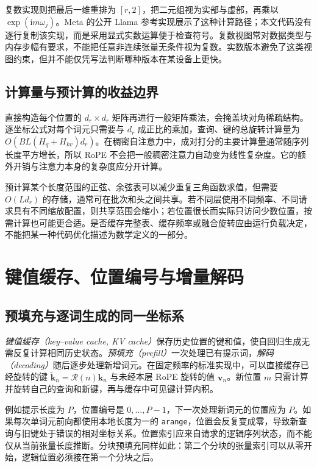 \documentclass[UTF8,12pt,a4paper,fontset=fandol]{ctexart}
\begin{document}
复数实现则把最后一维重排为 $[r,2]$，把二元组视为实部与虚部，再乘以 $\exp(\mathrm i m\omega_j)$。Meta 的公开 Llama 参考实现展示了这种计算路径\cite{meta-llama}；本文代码没有逐行复制该实现，而是采用显式实数运算便于检查符号。复数视图常对数据类型与内存步幅有要求，不能把任意非连续张量无条件视为复数。实数版本避免了这类视图约束，但并不能仅凭写法判断哪种版本在某设备上更快。

\subsection{计算量与预计算的收益边界}
直接构造每个位置的 $d_r\times d_r$ 矩阵再进行一般矩阵乘法，会掩盖块对角稀疏结构。逐坐标公式对每个词元只需要与 $d_r$ 成正比的乘加，查询、键的总旋转计算量为 $O(BL(H_q+H_{kv})d_r)$。在稠密自注意力中，成对打分的主要计算量通常随序列长度平方增长，所以 RoPE 不会把一般稠密注意力自动变为线性复杂度。它的额外开销与注意力本身的复杂度应分开计算。

预计算某个长度范围的正弦、余弦表可以减少重复三角函数求值，但需要 $O(Ld_r)$ 的存储，通常可在批次和头之间共享。若不同层使用不同频率、不同请求具有不同缩放配置，则共享范围会缩小；若位置很长而实际只访问少数位置，按需计算也可能更合适。是否缓存完整表、缓存频率或融合旋转应由运行负载决定，不能把某一种代码优化描述为数学定义的一部分。

\section{键值缓存、位置编号与增量解码}
\label{sec:rope-cache}

\subsection{预填充与逐词生成的同一坐标系}
\emph{键值缓存（key--value cache, KV cache）}保存历史位置的键和值，使自回归生成无需反复计算相同历史状态。\emph{预填充（prefill）}一次处理已有提示词，\emph{解码（decoding）}随后逐步处理新增词元。在固定频率的标准实现中，可以直接缓存已经旋转的键 $\widetilde{\mathbf k}_n=\mathcal R(n)\mathbf k_n$ 与未经本层 RoPE 旋转的值 $\mathbf v_n$。新位置 $m$ 只需计算并旋转自己的查询和新键，再与缓存中可见键计算内积。

例如提示长度为 $P$，位置编号是 $0,\ldots,P-1$，下一次处理新词元的位置应为 $P$。如果每次单词元前向都使用本地长度为一的 \texttt{arange}，位置会反复变成零，导致新查询与旧键处于错误的相对坐标关系。位置索引应来自请求的逻辑序列状态，而不能仅从当前张量长度推断。分块预填充同样如此：第二个分块的张量索引可以从零开始，逻辑位置必须接在第一个分块之后。
\end{document}
